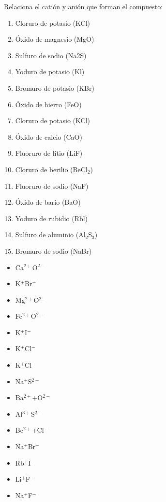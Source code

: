\documentclass[11pt]{book}
\begin{document}
\begin{boxK}
  Relaciona el catión y anión que forman el compuesto:\\

  \begin{minipage}{0.5\textwidth}
    \begin{enumerate}
      \item Cloruro de potasio (KCl)
      \item Óxido de magnesio (MgO)
      \item Sulfuro  de sodio (Na2S)
      \item Yoduro de potasio (Kl)
      \item Bromuro de potasio (KBr)
      \item Óxido de hierro (FeO)
      \item Cloruro de potasio  (KCl)
      \item Óxido de calcio (CaO)
      \item Fluoruro de litio (LiF)
      \item Cloruro de berilio (BeCl$_2$)
      \item Fluoruro de sodio (NaF)
      \item Óxido de bario (BaO)
      \item Yoduro de rubidio (Rbl)
      \item Sulfuro de aluminio (Al$_2$S$_3$)
      \item Bromuro de sodio (NaBr)
    \end{enumerate}
  \end{minipage}%
  \begin{minipage}{0.5\textwidth}
    \begin{itemize}
      \item[\rule{1cm}{0.2mm}] Ca$^{2+}$O$^{2-}$
      \item[\rule{1cm}{0.2mm}] K$^+$Br$^-$
      \item[\rule{1cm}{0.2mm}] Mg$^{2+}$O$^{2-}$
      \item[\rule{1cm}{0.2mm}] Fe$^{2+}$O$^{2-}$
      \item[\rule{1cm}{0.2mm}] K$^+$I$^-$
      \item[\rule{1cm}{0.2mm}] K$^+$Cl$^-$
      \item[\rule{1cm}{0.2mm}] K$^+$Cl$^-$
      \item[\rule{1cm}{0.2mm}] Na$^+$S$^{2-}$
      \item[\rule{1cm}{0.2mm}] Ba$^{2+}$+O$^{2-}$
      \item[\rule{1cm}{0.2mm}] Al$^{3+}$S$^{2-}$
      \item[\rule{1cm}{0.2mm}] Be$^{2+}$+Cl$^{-}$
      \item[\rule{1cm}{0.2mm}] Na$^+$Br$^-$
      \item[\rule{1cm}{0.2mm}] Rb$^+$I$^-$
      \item[\rule{1cm}{0.2mm}] Li$^+$F$^-$
      \item[\rule{1cm}{0.2mm}] Na$^+$F$^-$
    \end{itemize}
  \end{minipage}
\end{boxK}
\end{document}
